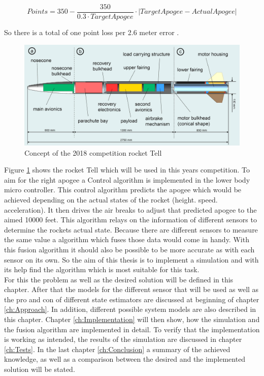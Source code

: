  $$ Points =  350 - \frac{350}{0.3\cdot TargetApogee} \cdot |TargetApogee - ActualApogee|$$
 
 So there is a total of one point loss per 2.6 meter error \cite{SpaceportAmericaCup2018}. \\
 \begin{figure}[h]
 \centering
 \includegraphics[width=.8\textwidth]{./Pictures/RocketModel.jpg}
 \caption{Concept of the 2018 competition rocket Tell}
 \label{fig:2018RocketModel}
\end{figure}
 Figure \ref{fig:2018RocketModel} shows the rocket Tell which will be used in this years competition.
 To aim for the right apogee a Control algorithm is implemented in the lower body micro controller.
 This control algorithm predicts the apogee which would be achieved depending on the actual states of the rocket (height. speed. acceleration).
 It then drives the air breaks to adjust that predicted apogee to the aimed 10000 feet.
 This algorithm relays on the information of different sensors to determine the rockets actual state.
 Because there are different sensors to measure the same value a algorithm which fuses those data would come in handy.
 With this fusion algorithm it should also be possible to be more accurate as with each sensor on its own.
 So the aim of this thesis is to implement a simulation and with its help find the algorithm which is most suitable for this task.\\
 For this the problem as well as the desired solution will be defined in this chapter.
 After that the models for the different sensor that will be used as well as the pro and con of different state estimators are discussed at beginning of chapter \ref{ch:Approach}.
 In addition, different possible system models are also described in this chapter.
 Chapter \ref{ch:Implementation} will then show, how the simulation and the fusion algorithm are implemented in detail.
 To verify that the implementation is working as intended, the results of the simulation are discussed in chapter \ref{ch:Tests}.
 In the last chapter \ref{ch:Conclusion} a summary of the achieved knowledge, as well as a comparison between the desired and the implemented solution will be stated.
 \newpage
 

